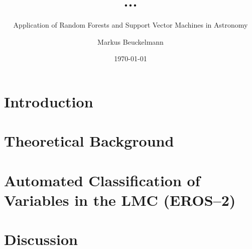 

\title{...}
\subtitle{Application of Random Forests and Support Vector Machines in Astronomy}

\author{Markus Beuckelmann}
\date{\today}






\label{sec:abstract}

\tableofcontents

\newpage

\chapter{Introduction}
\label{sec:introduction}


\chapter{Theoretical Background}
\label{sec:theory}


\chapter{Automated Classification of Variables in the LMC (EROS--2)}
\label{sec:main}


\chapter{Discussion}
\label{sec:discussion}


\cleardoublepage
{}
\listoffigures







\label{sec:declaration}


